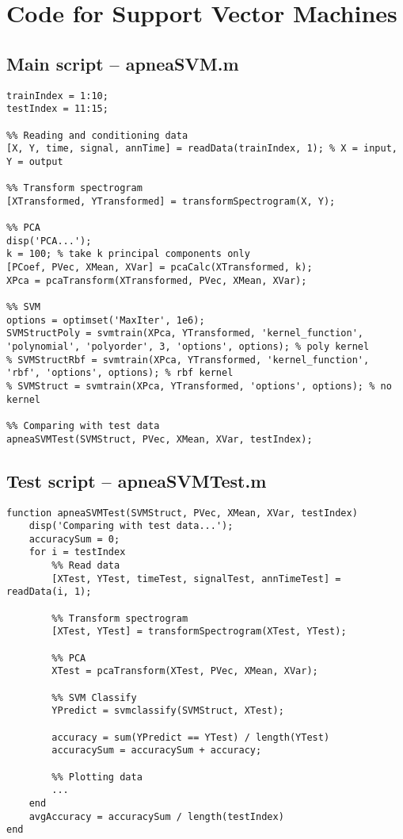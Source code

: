 \chapter{Code for Support Vector Machines}
\label{ch:SVMCode}

\section{Main script -- apneaSVM.m}
\label{sec:apneaSVM}
\begin{lstlisting}
trainIndex = 1:10;
testIndex = 11:15;

%% Reading and conditioning data
[X, Y, time, signal, annTime] = readData(trainIndex, 1); % X = input, Y = output

%% Transform spectrogram
[XTransformed, YTransformed] = transformSpectrogram(X, Y);

%% PCA
disp('PCA...');
k = 100; % take k principal components only
[PCoef, PVec, XMean, XVar] = pcaCalc(XTransformed, k);
XPca = pcaTransform(XTransformed, PVec, XMean, XVar);

%% SVM
options = optimset('MaxIter', 1e6);
SVMStructPoly = svmtrain(XPca, YTransformed, 'kernel_function', 'polynomial', 'polyorder', 3, 'options', options); % poly kernel
% SVMStructRbf = svmtrain(XPca, YTransformed, 'kernel_function', 'rbf', 'options', options); % rbf kernel
% SVMStruct = svmtrain(XPca, YTransformed, 'options', options); % no kernel

%% Comparing with test data
apneaSVMTest(SVMStruct, PVec, XMean, XVar, testIndex);
\end{lstlisting}

\section{Test script -- apneaSVMTest.m}
\label{sec:apneaSVMTest}
\begin{lstlisting}
function apneaSVMTest(SVMStruct, PVec, XMean, XVar, testIndex)
    disp('Comparing with test data...');
    accuracySum = 0;
    for i = testIndex
        %% Read data
        [XTest, YTest, timeTest, signalTest, annTimeTest] = readData(i, 1);
        
        %% Transform spectrogram
        [XTest, YTest] = transformSpectrogram(XTest, YTest);
        
        %% PCA
        XTest = pcaTransform(XTest, PVec, XMean, XVar);

        %% SVM Classify
        YPredict = svmclassify(SVMStruct, XTest);
        
        accuracy = sum(YPredict == YTest) / length(YTest)
        accuracySum = accuracySum + accuracy;
        
        %% Plotting data
        ...
    end
    avgAccuracy = accuracySum / length(testIndex)
end
\end{lstlisting}